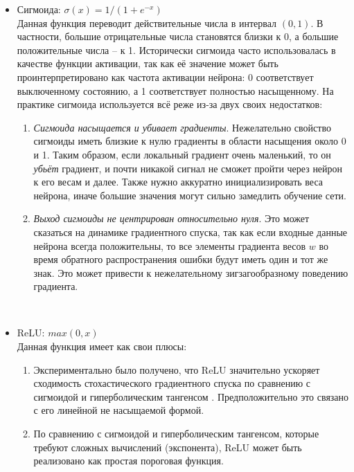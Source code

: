 \begin{itemize}
  \item Сигмоида: $\sigma(x) = 1 / (1 + e^{-x})$ \\
Данная функция переводит действительные числа в интервал $(0,1)$. В частности, большие отрицательные  числа становятся близки к 0, а большие положительные числа -- к 1. Исторически сигмоида часто использовалась в качестве функции активации, так как её значение может быть проинтерпретировано как частота активации нейрона: 0 соответствует выключенному состоянию, а 1 соответствует полностью насыщенному. На практике сигмоида используется всё реже из-за двух своих недостатков: \\

  \begin{enumerate}[label=\arabic*)]
    \item \textit{Сигмоида насыщается и убивает градиенты}. Нежелательно свойство сигмоиды иметь близкие к нулю градиенты в области насыщения около 0 и 1. Таким образом, если локальный градиент очень маленький, то он \textit{убьёт} градиент, и почти никакой сигнал не сможет пройти через нейрон к его весам и далее. Также нужно аккуратно инициализировать веса нейрона, иначе большие значения могут сильно замедлить обучение сети.
    \item \textit{Выход сигмоиды не центрирован относительно нуля}. Это может сказаться на динамике градиентного спуска, так как если входные данные нейрона всегда положительны, то все элементы градиента весов $w$ во время обратного распространения ошибки будут иметь один и тот же знак. Это может привести к нежелательному зигзагообразному поведению градиента.
  \end{enumerate}
  \

  \item ReLU: $max(0, x)$\\
Данная функция имеет как свои плюсы: \\

  \begin{enumerate}[label=\arabic*)]
    \item Экспериментально было получено, что ReLU значительно ускоряет сходимость стохастического градиентного спуска по сравнению с сигмоидой и гиперболическим тангенсом \cite{Alexnet}. Предположительно это связано с его линейной не насыщаемой формой.
    \item По сравнению с сигмоидой и гиперболическим тангенсом, которые требуют сложных вычислений (экспонента), ReLU может быть реализовано как простая пороговая функция. 
  \end{enumerate}
  \


\end{itemize}
